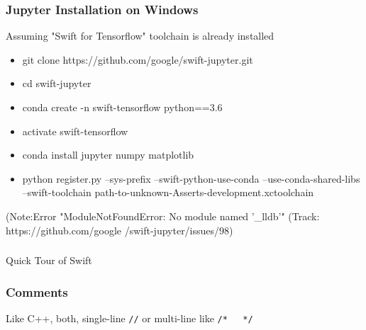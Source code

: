 \begin{frame} \frametitle{Jupyter Installation on Windows}

Assuming "Swift for Tensorflow" toolchain is already installed

\begin{itemize}
\item git clone https://github.com/google/swift-jupyter.git
\item cd swift-jupyter
\item conda create -n swift-tensorflow python==3.6
\item activate swift-tensorflow
\item conda install jupyter numpy matplotlib
\item python register.py --sys-prefix --swift-python-use-conda --use-conda-shared-libs --swift-toolchain path-to-unknown-Asserts-development.xctoolchain
\end{itemize}

{\tiny (Note:Error "ModuleNotFoundError: No module named '\_lldb'" (Track: https://github.com/google /swift-jupyter/issues/98)}
 
\end{frame}

\begin{frame}[fragile]\frametitle{}
\begin{center}
{\Large Quick Tour of Swift}
\end{center}
\end{frame}


\begin{frame}[fragile] \frametitle{Comments}

Like C++, both, single-line \lstinline|//| or multi-line like \lstinline|/*   */|

\end{frame}

